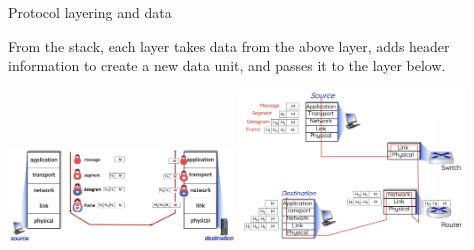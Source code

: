 \begin{theorem}
    {Protocol layering and data}

    From the stack, each layer takes data from the above layer, adds header information to create a new data unit, and passes it to the layer below.

    \begin{center}
        \includegraphics[width=0.45\textwidth]{./images/m01-l02-2.png}
        \includegraphics[width=0.45\textwidth]{./images/m01-l02-3.png}
    \end{center}
\end{theorem}
